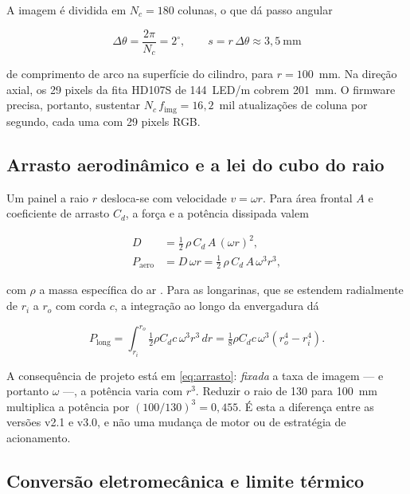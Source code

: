 \documentclass[10pt,a4paper,twocolumn]{article}
\begin{document}
A imagem é dividida em $N_c=180$ colunas, o que dá passo angular

\begin{equation}
\Delta\theta = \frac{2\pi}{N_c} = 2^\circ ,
\qquad
s = r\,\Delta\theta \approx 3{,}5~\mathrm{mm}
\label{eq:passo}
\end{equation}

\noindent de comprimento de arco na superfície do cilindro, para $r=100$~mm. Na direção
axial, os 29 pixels da fita HD107S de 144~LED/m cobrem 201~mm. O firmware
precisa, portanto, sustentar $N_c\,f_{\mathrm{img}} = 16{,}2$~mil atualizações
de coluna por segundo, cada uma com 29 pixels RGB.

\subsection{Arrasto aerodinâmico e a lei do cubo do raio}

Um painel a raio $r$ desloca-se com velocidade $v=\omega r$. Para área frontal
$A$ e coeficiente de arrasto $C_d$, a força e a potência dissipada valem

\begin{equation}
\begin{aligned}
D &= \tfrac{1}{2}\,\rho\,C_d\,A\,(\omega r)^2 ,\\[2pt]
P_{\mathrm{aero}} &= D\,\omega r
   = \tfrac{1}{2}\,\rho\,C_d\,A\,\omega^3 r^3 ,
\end{aligned}
\label{eq:arrasto}
\end{equation}

\noindent com $\rho$ a massa específica do ar \cite{white2011,hoerner1965}. Para as
longarinas, que se estendem radialmente de $r_i$ a $r_o$ com corda $c$, a
integração ao longo da envergadura dá

\begin{equation}
P_{\mathrm{long}} = \int_{r_i}^{r_o}\!\tfrac{1}{2}\rho C_d c\,\omega^3 r^3\,dr
= \tfrac{1}{8}\rho C_d c\,\omega^3\!\left(r_o^4 - r_i^4\right).
\label{eq:longarina}
\end{equation}

A consequência de projeto está em \eqref{eq:arrasto}: \emph{fixada} a taxa de
imagem --- e portanto $\omega$ ---, a potência varia com $r^3$. Reduzir o raio
de 130 para 100~mm multiplica a potência por $(100/130)^3 = 0{,}455$. É esta a
diferença entre as versões v2.1 e v3.0, e não uma mudança de motor ou de
estratégia de acionamento.

\subsection{Conversão eletromecânica e limite térmico}
\end{document}
